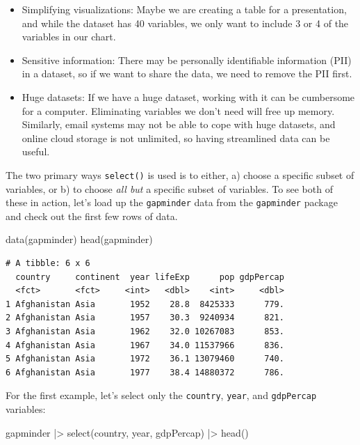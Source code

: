 \documentclass[
  letterpaper,
]{book}
\newenvironment{Shaded}{\begin{snugshade}}{\end{snugshade}}
\newcommand{\FunctionTok}[1]{\textcolor[rgb]{0.28,0.35,0.67}{#1}}
\newcommand{\NormalTok}[1]{\textcolor[rgb]{0.00,0.23,0.31}{#1}}
\newcommand{\SpecialCharTok}[1]{\textcolor[rgb]{0.37,0.37,0.37}{#1}}
\begin{document}
\begin{itemize}
\item
  Simplifying visualizations: Maybe we are creating a table for a
  presentation, and while the dataset has 40 variables, we only want to
  include 3 or 4 of the variables in our chart.
\item
  Sensitive information: There may be personally identifiable
  information (PII) in a dataset, so if we want to share the data, we
  need to remove the PII first.
\item
  Huge datasets: If we have a huge dataset, working with it can be
  cumbersome for a computer. Eliminating variables we don't need will
  free up memory. Similarly, email systems may not be able to cope with
  huge datasets, and online cloud storage is not unlimited, so having
  streamlined data can be useful.
\end{itemize}

The two primary ways \texttt{select()} is used is to either, a) choose a
specific subset of variables, or b) to choose \emph{all but} a specific
subset of variables. To see both of these in action, let's load up the
\texttt{gapminder} data from the \texttt{gapminder} package and check
out the first few rows of data.

\begin{Shaded}
\begin{Highlighting}[]
\FunctionTok{data}\NormalTok{(gapminder)}
\FunctionTok{head}\NormalTok{(gapminder)}
\end{Highlighting}
\end{Shaded}

\begin{verbatim}
# A tibble: 6 x 6
  country     continent  year lifeExp      pop gdpPercap
  <fct>       <fct>     <int>   <dbl>    <int>     <dbl>
1 Afghanistan Asia       1952    28.8  8425333      779.
2 Afghanistan Asia       1957    30.3  9240934      821.
3 Afghanistan Asia       1962    32.0 10267083      853.
4 Afghanistan Asia       1967    34.0 11537966      836.
5 Afghanistan Asia       1972    36.1 13079460      740.
6 Afghanistan Asia       1977    38.4 14880372      786.
\end{verbatim}

For the first example, let's select only the \texttt{country},
\texttt{year}, and \texttt{gdpPercap} variables:

\begin{Shaded}
\begin{Highlighting}[]
\NormalTok{gapminder }\SpecialCharTok{|\textgreater{}} 
  \FunctionTok{select}\NormalTok{(country, year, gdpPercap) }\SpecialCharTok{|\textgreater{}} 
  \FunctionTok{head}\NormalTok{()}
\end{Highlighting}
\end{Shaded}
\end{document}
